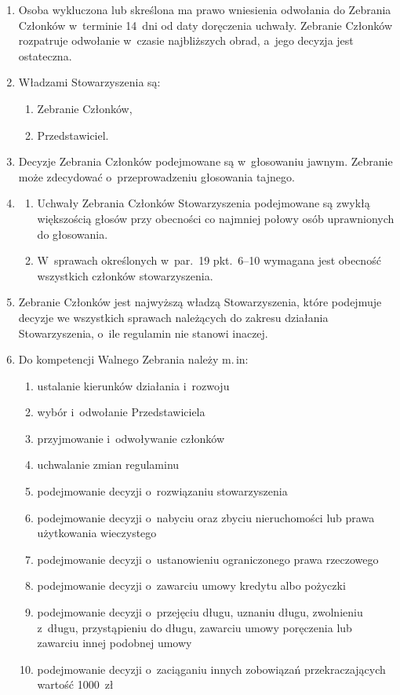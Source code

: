 \documentclass[11pt,a4paper]{article}
\begin{document}
\begin{enumerate}
  \item Osoba wykluczona lub skreślona ma prawo wniesienia odwołania do Zebrania Członków w~terminie 14~dni od daty doręczenia uchwały. Zebranie Członków rozpatruje odwołanie w~czasie najbliższych obrad, a~jego decyzja jest ostateczna.

  \item Władzami Stowarzyszenia są:
  \begin{enumerate}
    \item Zebranie Członków,
    \item Przedstawiciel.
  \end{enumerate}

  \item Decyzje Zebrania Członków podejmowane są w~głosowaniu jawnym. Zebranie może zdecydować o~przeprowadzeniu głosowania tajnego.

  \item
  \begin{enumerate}
    \item Uchwały Zebrania Członków Stowarzyszenia podejmowane są zwykłą większością głosów przy obecności co najmniej połowy osób uprawnionych do głosowania.
    \item W~sprawach określonych w~par.~19 pkt.~6--10 wymagana jest obecność wszystkich członków stowarzyszenia.
  \end{enumerate}

  \item Zebranie Członków jest najwyższą władzą Stowarzyszenia, które podejmuje decyzje we wszystkich sprawach należących do zakresu działania Stowarzyszenia, o~ile regulamin nie stanowi inaczej.

  \item Do kompetencji Walnego Zebrania należy m.\,in:
  \begin{enumerate}
    \item ustalanie kierunków działania i~rozwoju
    \item wybór i~odwołanie Przedstawiciela
    \item przyjmowanie i~odwoływanie członków
    \item uchwalanie zmian regulaminu
    \item podejmowanie decyzji o~rozwiązaniu stowarzyszenia
    \item podejmowanie decyzji o~nabyciu oraz zbyciu nieruchomości lub prawa użytkowania wieczystego
    \item podejmowanie decyzji o~ustanowieniu ograniczonego prawa rzeczowego
    \item podejmowanie decyzji o~zawarciu umowy kredytu albo pożyczki
    \item podejmowanie decyzji o~przejęciu długu, uznaniu długu, zwolnieniu z~długu, przystąpieniu do długu, zawarciu umowy poręczenia lub zawarciu innej podobnej umowy
    \item podejmowanie decyzji o~zaciąganiu innych zobowiązań przekraczających wartość 1000~zł
  \end{enumerate}


\end{enumerate}
\end{document}
